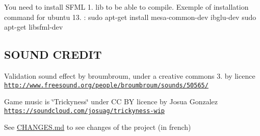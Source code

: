You need to install S\-F\-M\-L 1. lib to be able to compile. Exemple of installation command for ubuntu 13. \-: sudo apt-\/get install mesa-\/common-\/dev ibglu-\/dev sudo apt-\/get libsfml-\/dev

\subsection*{S\-O\-U\-N\-D C\-R\-E\-D\-I\-T }

Validation sound effect by broumbroum, under a creative commons 3. by licence \href{http://www.freesound.org/people/broumbroum/sounds/50565/}{\tt http\-://www.\-freesound.\-org/people/broumbroum/sounds/50565/}

Game music is \char`\"{}\-Trickyness\char`\"{} under C\-C B\-Y licence by Josua Gonzalez \href{https://soundcloud.com/josuag/trickyness-wip}{\tt https\-://soundcloud.\-com/josuag/trickyness-\/wip}

See \hyperlink{_c_h_a_n_g_e_s_8md}{C\-H\-A\-N\-G\-E\-S.\-md} to see changes of the project (in french) 
